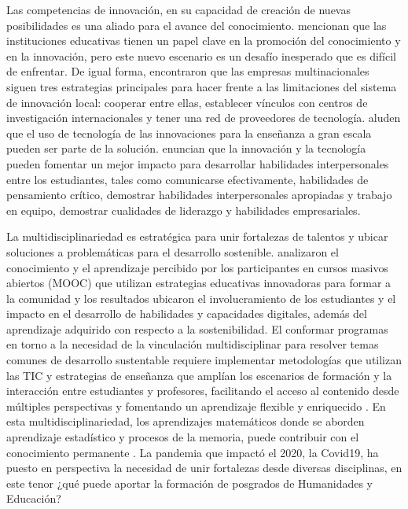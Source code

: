 \documentclass[spanish]{textolivre}
\begin{document}
Las competencias de innovación, en su capacidad de creación de nuevas posibilidades es una aliado para el avance del conocimiento. \textcite{picatoste_new_2018} mencionan que las instituciones educativas tienen un papel clave en la promoción del conocimiento y en la innovación, pero este nuevo escenario es un desafío inesperado que es difícil de enfrentar. De igual forma, \textcite{aboal_knowledge_2018} encontraron que las empresas multinacionales siguen tres estrategias principales para hacer frente a las limitaciones del sistema de innovación local: cooperar entre ellas, establecer vínculos con centros de investigación internacionales y tener una red de proveedores de tecnología. \textcite{sanchez-gordon_technological_2018} aluden que el uso de tecnología de las innovaciones para la enseñanza a gran escala pueden ser parte de la solución. \textcite{ibrahim_innovation_2018} enuncian que la innovación y la tecnología pueden fomentar un mejor impacto para desarrollar habilidades interpersonales entre los estudiantes, tales como comunicarse efectivamente, habilidades de pensamiento crítico, demostrar habilidades interpersonales apropiadas y trabajo en equipo, demostrar cualidades de liderazgo y habilidades empresariales.

La multidisciplinariedad es estratégica para unir fortalezas de talentos y ubicar soluciones a problemáticas para el desarrollo sostenible. \textcite{carrera_innovative_2018} analizaron el conocimiento y el aprendizaje percibido por los participantes en cursos masivos abiertos (MOOC) que utilizan estrategias educativas innovadoras para formar a la comunidad y los resultados ubicaron el involucramiento de los estudiantes y el impacto en el desarrollo de habilidades y capacidades digitales, además del aprendizaje adquirido con respecto a la sostenibilidad. El conformar programas en torno a la necesidad de la vinculación multidisciplinar para resolver temas comunes de desarrollo sustentable requiere implementar metodologías que utilizan las TIC y estrategias de enseñanza que amplían los escenarios de formación y la interacción entre estudiantes y profesores, facilitando el acceso al contenido desde múltiples perspectivas y fomentando un aprendizaje flexible y enriquecido \cite{ramirez-montoya_characterization_2021}. En esta multidisciplinariedad, los aprendizajes matemáticos donde se aborden aprendizaje estadístico y procesos de la memoria, puede contribuir con el conocimiento permanente \cite{gomez_infants_2017}. La pandemia que impactó el 2020, la Covid19, ha puesto en perspectiva la necesidad de unir fortalezas desde diversas disciplinas, en este tenor ¿qué puede aportar la formación de posgrados de Humanidades y Educación?
\end{document}
